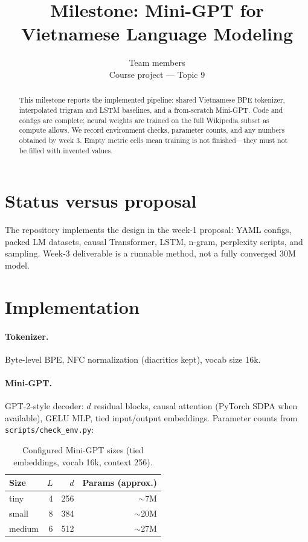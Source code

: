 \documentclass[11pt]{article}
\title{Milestone: Mini-GPT for Vietnamese Language Modeling}
\author{Team members \\
  Course project --- Topic 9}
\begin{document}
\maketitle

\begin{abstract}
This milestone reports the implemented pipeline: shared Vietnamese BPE tokenizer, interpolated trigram and LSTM baselines, and a from-scratch Mini-GPT. Code and configs are complete; neural weights are trained on the full Wikipedia subset as compute allows. We record environment checks, parameter counts, and any numbers obtained by week 3. Empty metric cells mean training is not finished---they must not be filled with invented values.
\end{abstract}

\section{Status versus proposal}

The repository implements the design in the week-1 proposal: YAML configs, packed LM datasets, causal Transformer, LSTM, n-gram, perplexity scripts, and sampling. Week-3 deliverable is a runnable method, not a fully converged 30M model.

\section{Implementation}

\paragraph{Tokenizer.} Byte-level BPE, NFC normalization (diacritics kept), vocab size 16k.

\paragraph{Mini-GPT.} GPT-2-style decoder: $d$ residual blocks, causal attention (PyTorch SDPA when available), GELU MLP, tied input/output embeddings. Parameter counts from \texttt{scripts/check\_env.py}:

\begin{table}[t]
\centering
\small
\begin{tabular}{lrrr}
\toprule
Size & $L$ & $d$ & Params (approx.) \\
\midrule
tiny   & 4 & 256 & $\sim$7M \\
small  & 8 & 384 & $\sim$20M \\
medium & 6 & 512 & $\sim$27M \\
\bottomrule
\end{tabular}
\caption{Configured Mini-GPT sizes (tied embeddings, vocab 16k, context 256).}
\end{table}
\end{document}
